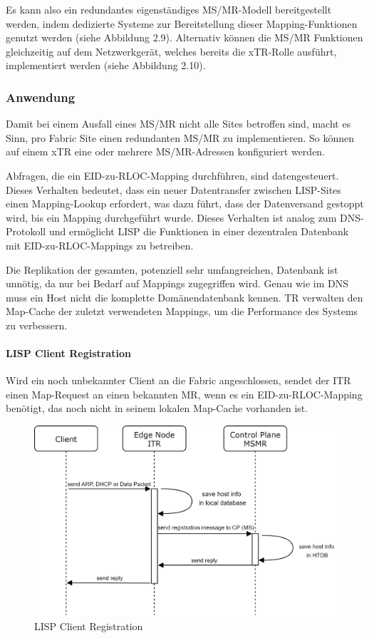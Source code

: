 Es kann also ein redundantes eigenständiges MS/MR-Modell bereitgestellt werden, indem dedizierte Systeme zur Bereitstellung dieser Mapping-Funktionen genutzt werden (siehe Abbildung 2.9). Alternativ können die MS/MR Funktionen gleichzeitig auf dem Netzwerkgerät, welches bereits die xTR-Rolle ausführt, implementiert werden (siehe Abbildung 2.10).

\subsubsection{Anwendung}
Damit bei einem Ausfall eines MS/MR nicht alle Sites betroffen sind, macht es Sinn, pro Fabric Site einen redundanten MS/MR zu implementieren. So können auf einem xTR eine oder mehrere MS/MR-Adressen konfiguriert werden.

Abfragen, die ein EID-zu-RLOC-Mapping durchführen, sind datengesteuert. Dieses Verhalten bedeutet, dass ein neuer Datentransfer zwischen LISP-Sites einen Mapping-Lookup erfordert, was dazu führt, dass der Datenversand gestoppt wird, bis ein Mapping durch\-geführt wurde. Dieses Verhalten ist analog zum DNS-Protokoll und ermöglicht LISP die Funktionen in einer dezentralen Datenbank mit EID-zu-RLOC-Mappings zu betreiben. 

Die Replikation der gesamten, potenziell sehr umfangreichen, Datenbank ist unnötig, da nur bei Bedarf auf Mappings zugegriffen wird. Genau wie im DNS muss ein Host nicht die komplette Domänendatenbank kennen. TR verwalten den Map-Cache der zuletzt verwendeten Mappings, um die Performance des Systems zu verbessern.

\paragraph{LISP Client Registration}
Wird ein noch unbekannter Client an die Fabric angeschlossen, sendet der ITR einen Map-Request an einen bekannten MR, wenn es ein EID-zu-RLOC-Mapping benötigt, das noch nicht in seinem lokalen Map-Cache vorhanden ist.

\begin{figure}[H]
	\centering
	\includegraphics[width=0.8\linewidth]{img/Absicherung/LISP-ClientRegistration}
	\caption{LISP Client Registration}
	\label{fig:LISP Client Registration}
\end{figure}

